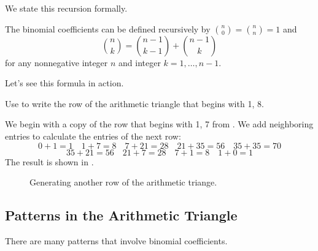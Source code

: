 We state this recursion formally.

\begin{thm}
\label{thm_pascals_recursion}
    The binomial coefficients can be defined recursively by $\binom{n}{0}=\binom{n}{n}=1$ and 
                $$\binom{n}{k}=\binom{n-1}{k-1} + \binom{n-1}{k}$$
    for any nonnegative integer $n$ and integer $k=1, \ldots, n-1$.
\end{thm}

Let's see this formula in action.

\begin{exam}
\label{exam_arith_tri_row9}
    Use  to write the row of the arithmetic triangle that begins with 1, 8.  
        \begin{soln}
            We begin with a copy of the row that begins with 1, 7 from . We add neighboring entries to calculate the entries of the next row: $$ 0+1=1 \quad 1+7=8\quad 7 +21 = 28\quad 21+35 = 56\quad 35+35=70$$
            $$35+21 = 56\quad 21+7 = 28\quad 7+1 = 8\quad 1 + 0 = 1$$
            The result is shown in .

                \begin{figure}[hbtp]
                    \centering
                    \scalebox{0.85}{}
                    \caption{Generating another row of the arithmetic triange.}
                    \label{fig_arith_triangle_recursion}
                \end{figure}
        \end{soln}
\end{exam}

\newcommand{\subpascalpatterns}{Patterns in the Arithmetic Triangle}
\subsection{\subpascalpatterns}
\label{sub_pascal_patterns}

There are many patterns that involve binomial coefficients.  

